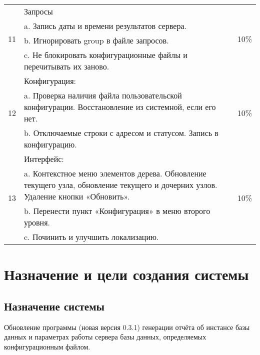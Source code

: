 \documentclass[10pt,a4paper]{article}
\begin{document}
\begin{table}
\begin{center}
\begin{tabularx}{\linewidth}{|c|X|c|}
		\multirow{4}{*}{11} & Запросы & \multirow{4}{*}{10\%} \\

		   & a. Запись даты и времени результатов сервера. & \\

		   & b. Игнорировать group в файле запросов. & \\

		   & c. Не блокировать конфигурационные файлы и перечитывать их заново. & \\

		\hline

		\multirow{3}{*}{12} & Конфигурация: & \multirow{3}{*}{10\%} \\

		   & a. Проверка наличия файла пользовательской конфигурации.
		   Восстановление из системной, если его нет. & \\

		   & b. Отключаемые строки с адресом и статусом. Запись в конфигурацию.
		   & \\

		\hline

		\multirow{4}{*}{13} & Интерфейс: & \multirow{4}{*}{10\%} \\

		   & a. Контекстное меню элементов дерева. Обновление текущего узла,
		обновление текущего и дочерних узлов. Удаление кнопки «Обновить». & \\

		   & b. Перенести пункт «Конфигурация» в меню второго уровня. & \\

		   & c. Починить и улучшить локализацию. & \\

		\hline
\end{tabularx}
\end{center}
\end{table}

\section{Назначение и цели создания системы}

\subsection{Назначение системы}

Обновление программы (новая версия 0.3.1) генерации отчёта об инстансе базы
данных и параметрах работы сервера базы данных, определяемых конфигурационным
файлом.
\end{document}
